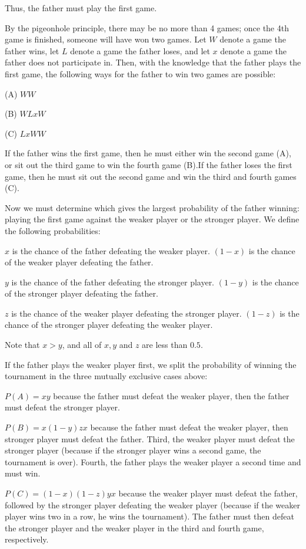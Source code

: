 \begin{enumerate}
 
Thus, the father must play the first game.

 
By the pigeonhole principle, there may be no more than 4 games; once the 4th game is finished, someone will have won two games.  Let $W$ denote a game the father wins, let $L$ denote a game the father loses, and let $x$ denote a game the father does not participate in.  Then, with the knowledge that the father plays the first game, the following ways for the father to win two games are possible:

 (A)  $WW$

 (B)  $WLxW$

 (C)  $LxWW$

 If the father wins the first game, then he must either win the second game (A), or sit out the third game to win the fourth game (B).If the father loses the first game, then he must sit out the second game and win the third and fourth games (C).

 Now we must determine which gives the largest probability of the father winning: playing the first game against the weaker player or the stronger player.  We define the following probabilities:

 $x$ is the chance of the father defeating the weaker player.  $(1-x)$ is the chance of the weaker player defeating the father.

 $y$ is the chance of the father defeating the stronger player.  $(1-y)$ is the chance of the stronger player defeating the father.

 $z$ is the chance of the weaker player defeating the stronger player.  $(1-z)$ is the chance of the stronger player defeating the weaker player.

 Note that $x > y$, and all of $x, y$ and $z$ are less than $0.5$.

 If the father plays the weaker player first, we split the probability of winning the tournament in the three mutually exclusive cases above:

 $P(A) = xy$ because the father must defeat the weaker player, then the father must defeat the stronger player.

 $P(B) = x(1-y)zx$ because the father must defeat the weaker player, then stronger player must defeat the father.  Third, the weaker player must defeat the stronger player (because if the stronger player wins a second game, the tournament is over).  Fourth, the father plays the weaker player a second time and must win.

 $P(C) = (1-x)(1-z)yx$ because the weaker player must defeat the father, followed by the stronger player defeating the weaker player (because if the weaker player wins two in a row, he wins the tournament).  The father must then defeat the stronger player and the weaker player in the third and fourth game, respectively.


\end{enumerate}
